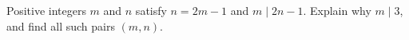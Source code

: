 Positive integers $m$ and $n$ satisfy $n=2m-1$ and $m\mid 2n-1$. Explain why $m\mid3$, and find all such pairs $(m,n)$.
